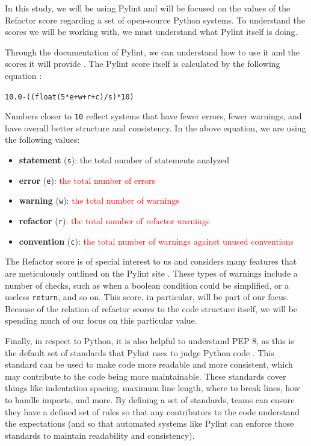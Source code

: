 \documentclass[12pt,conference]{IEEEtran}
\newcommand\todo[1]{\textcolor{red}{#1}}
\newcommand{\code}[1]{\texttt{#1}}
\begin{document}
In this study, we will be using Pylint and will be focused on the values of the Refactor score regarding a set of open-source Python systems. To understand the scores we will be working with, we must understand what Pylint itself is doing. 

Through the documentation of Pylint, we can understand how to use it and the scores it will provide \cite{pylint:main}. The Pylint score itself is calculated by the following equation \cite{pylint:score}:

\vspace{0.25cm}

\code{10.0-((float(5*e+w+r+c)/s)*10)}

\vspace{0.25cm}

Numbers closer to \code{10} reflect systems that have fewer errors, fewer warnings, and have overall better structure and consistency. In the above equation, we are using the following values:

\vspace{0.25cm}

\begin{itemize}
    \item \textbf{statement} (\code{s}): the total number of statements analyzed
    \item \textbf{error} (\code{e}): \todo{the total number of errors}
    \item \textbf{warning} (\code{w}): \todo{the total number of warnings}
    \item \textbf{refactor} (\code{r}): \todo{the total number of refactor warnings}
    \item \textbf{convention} (\code{c}): \todo{the total number of warnings against unused conventions}
\end{itemize}

\vspace{0.25cm}

The Refactor score is of special interest to us and considers many features that are meticulously outlined on the Pylint site \cite{pylint:refactor}. These types of warnings include a number of checks, such as when a boolean condition could be simplified, or a useless \code{return}, and so on. This score, in particular, will be part of our focus. Because of the relation of refactor scores to the code structure itself, we will be spending much of our focus on this particular value.

Finally, in respect to Python, it is also helpful to understand PEP 8, as this is the default set of standards that Pylint uses to judge Python code \cite{pylint:pep8}. This standard can be used to make code more readable and more consistent, which may contribute to the code being more maintainable. These standards cover things like indentation spacing, maximum line length, where to break lines, how to handle imports, and more. By defining a set of standards, teams can ensure they have a defined set of rules so that any contributors to the code understand the expectations (and so that automated systems like Pylint can enforce those standards to maintain readability and consistency).
\end{document}
